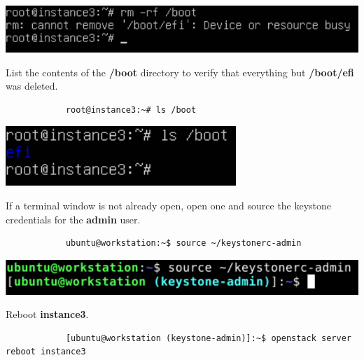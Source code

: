\documentclass[letterpaper, 12pt]{article}
\begin{document}
\begin{enumerate}
\begin{labstep}
        \begin{center}
            \includegraphics[width=\linewidth]{images/part8/step3.png}
        \end{center}
    \end{labstep}

    \begin{labstep}
        List the contents of the \textbf{/boot} directory to verify that everything but \textbf{/boot/efi} was deleted.
        \begin{lstlisting}
            root@instance3:~# ls /boot
        \end{lstlisting}

        \begin{center}
            \includegraphics[width=\linewidth]{images/part8/step4.png}
        \end{center}
    \end{labstep}

    \begin{labstep}
        If a terminal window is not already open, open one and source the keystone credentials for the \textbf{admin} user.
        \begin{lstlisting}
            ubuntu@workstation:~$ source ~/keystonerc-admin
        \end{lstlisting}

        \begin{center}
            \includegraphics[width=\linewidth]{images/part8/step5.png}
        \end{center}
    \end{labstep}

    \begin{labstep}
        Reboot \textbf{instance3}.
        \begin{lstlisting}
            [ubuntu@workstation (keystone-admin)]:~$ openstack server reboot instance3
        \end{lstlisting}


\end{labstep}
\end{enumerate}
\end{document}
